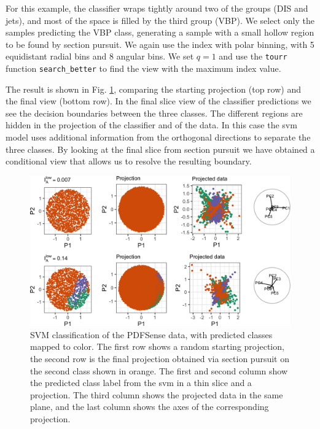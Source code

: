\documentclass[
]{article}
\begin{document}
For this example, the classifier wraps tightly around two of the groups
(DIS and jets), and most of the space is filled by the third group
(VBP). We select only the samples predicting the VBP class, generating a
sample with a small hollow region to be found by section pursuit. We
again use the index with polar binning, with 5 equidistant radial bins
and 8 angular bins. We set \(q=1\) and use the \texttt{tourr} function
\texttt{search\_better} to find the view with the maximum index value.

The result is shown in Fig. \ref{fig:pdffit}, comparing the starting
projection (top row) and the final view (bottom row). In the final slice
view of the classifier predictions we see the decision boundaries
between the three classes. The different regions are hidden in the
projection of the classifier and of the data. In this case the svm model
uses additional information from the orthogonal directions to separate
the three classes. By looking at the final slice from section pursuit we
have obtained a conditional view that allows us to resolve the resulting
boundary.

\begin{figure}
\includegraphics[width=1\linewidth]{appendix_files/figure-latex/pdffit-1} \caption{SVM classification of the PDFSense data, with predicted classes mapped to color. The first row shows a random starting projection, the second row is the final projection obtained via section pursuit on the second class shown in orange. The first and second column show the predicted class label from the svm in a thin slice and a projection. The third column shows the projected data in the same plane, and the last column shows the axes of the corresponding projection.}\label{fig:pdffit}
\end{figure}
\end{document}
